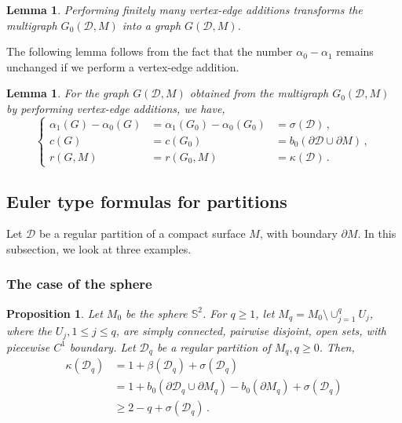 \documentclass[12pt,a4paper]{amsart}
\theoremstyle{plain} %
\newtheorem{lemma}[theorem]{Lemma}
\newtheorem{proposition}[theorem]{Proposition}
\theoremstyle{definition}
\numberwithin{equation}{section}
\numberwithin{figure}{section}
\numberwithin{table}{section}
\newcommand{\bS}{\mathbb{S}}
\newcommand{\cD}{\mathcal{D}}
\newcommand{\sm}{\!\setminus\!}
\newcommand{\bD}{\partial \cD}
\begin{document}
\begin{lemma}\label{L-gr-4}
Performing finitely many  vertex-edge additions transforms the multigraph $G_0(\cD,M)$ into a graph $G(\cD,M)$.
\end{lemma}

The following lemma follows from the fact that the number $\alpha_0 - \alpha_1$ remains unchanged if we perform a vertex-edge addition.

\begin{lemma}\label{L-gr-6}
For the graph $G(\cD,M)$ obtained from the multigraph $G_0(\cD,M)$ by performing  vertex-edge additions, we have,
%
\begin{equation*}
\left\{
\begin{array}{rll}
\alpha_1(G) - \alpha_0(G) & = \alpha_1(G_0) - \alpha_0(G_0) & = \sigma(\cD) \,,\\[5pt]
c(G) & = c(G_0) & = b_0(\bD \cup \partial M)\,,\\[5pt]
r(G,M) & = r(G_0,M) & = \kappa(\cD)\,.
\end{array}%
\right.
\end{equation*}
\end{lemma}%



\subsection{Euler type formulas for partitions}\label{SS-etf}

Let $\cD$ be a regular partition of a compact surface $M$, with boundary $\partial M$. In this subsection, we look at three examples.

\subsubsection{The case of the sphere}\label{SS-etf0}

\begin{proposition}\label{P-etf0-2} Let $M_0$ be the sphere $\bS^2$. For $q \ge 1$, let $M_q = M_0\sm \cup_{j=1}^q U_j$, where the $U_j, 1 \le j \le q$, are simply connected, pairwise disjoint, open sets, with piecewise $C^1$ boundary. Let $\mathcal D_q$ be a regular partition of $M_q, q\ge 0$. Then,
\begin{equation}\label{E-etf0-2}
\begin{split}
\kappa(\cD_q) & = 1 + \beta(\cD_q) + \sigma(\cD_q) \\[5pt]
& = 1 + b_0(\bD_q \cup \partial M_q) - b_0(\partial M_q)  + \sigma(\cD_q)\\[5pt]
& \ge 2 - q  + \sigma(\cD_q)\,.
\end{split}%
\end{equation}
\end{proposition}
\end{document}
